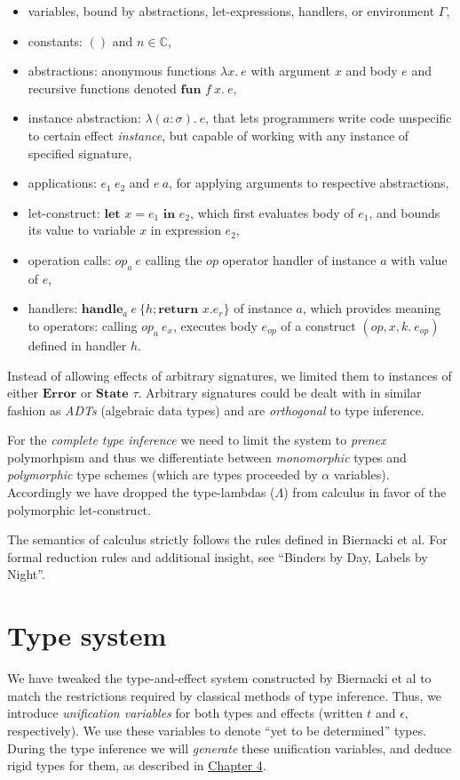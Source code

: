 \documentclass[declaration,shortabstract]{iithesis}
\theoremstyle{definition} \newtheorem{definition}{Definition}[section]
\newcommand{\lam}[1][x]{\ensuremath{\lambda #1.\:}}
\begin{document}
\begin{itemize}
    \item variables, bound by abstractions, let-expressions, handlers, or environment $\Gamma$,
    \item constants: $()$ and $n \in \mathbb{C}$,
    \item abstractions: anonymous functions $\lam e$ with argument $x$ and body $e$ and recursive functions denoted $\textbf{fun }f\:x.\:e$,
    \item instance abstraction: $\lam[(a:\sigma)]e$, that lets programmers write code
    unspecific to certain effect \textit{instance}, but capable of working with any
    instance of specified signature,
    \item applications: $e_1\:e_2$ and $e\:a$, for applying arguments to respective abstractions, 
    \item let-construct: $\textbf{let } x = e_1 \textbf{ in } e_2$, which first evaluates body of $e_1$,
    and bounds its value to variable $x$ in expression $e_2$,
    \item operation calls: $op_a\:e$ calling the $op$ operator handler of instance $a$ with value
    of $e$,
    \item handlers: $\textbf{handle}_a \: e\: \{h;\textbf{return } x. e_r\}$ of instance $a$, 
    which provides meaning to operators: calling $op_a\:e_x$, executes body $e_{op}$ of
    a construct $(op, x, k.\:e_{op})$ defined in handler $h$.
\end{itemize}

Instead of allowing effects of arbitrary signatures, we limited them to instances
of either $\textbf{Error}$ or  $\textbf{State }\tau$.
Arbitrary signatures could be dealt with in similar fashion as \textit{ADTs}
(algebraic data types) and are \textit{orthogonal} to type inference.

For the \textit{complete type inference} we need to limit the system to \textit{prenex}
polymorhpism and thus we differentiate between \textit{monomorphic} types and \textit{polymorphic}
type schemes (which are types proceeded by $\alpha$ variables).
Accordingly we have dropped the type-lambdas ($\Lambda$) from calculus in favor of the
polymorphic let-construct.

The semantics of calculus strictly follows the rules defined in Biernacki et al.
For formal reduction rules and additional insight, see ``Binders by Day, Labels by Night''\cite{binders-labels}.
\chapter{Type system}
We have tweaked the type-and-effect system constructed by Biernacki et al\cite{binders-labels}
to match the restrictions required by classical methods of type inference.
Thus, we introduce \textit{unification variables} for both types and effects
(written $t$ and $\epsilon$, respectively).
We use these variables to denote ``yet to be determined'' types.
During the type inference we will \textit{generate} these unification variables,
and deduce rigid types for them, as described in \hyperlink{chapter.4}{Chapter 4}.
\end{document}
